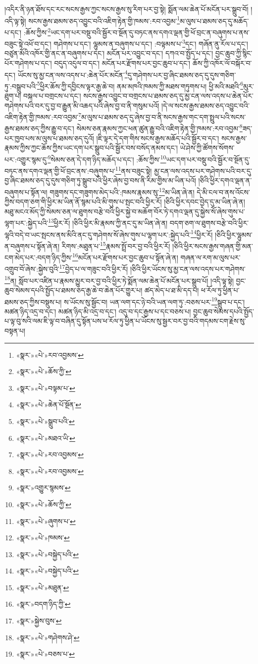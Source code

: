 །འདིར་ནི་ཉན་ཐོས་དང་རང་སངས་རྒྱས་ཀྱང་སངས་རྒྱས་སུ་རིག་པར་བྱ་སྟེ། སྨོན་ལམ་ཆེན་པོ་མངོན་པར་སྒྲུབ་བོ། །འདི་ལྟ་སྟེ། སངས་རྒྱས་ཐམས་ཅད་འབྱུང་བའི་འཇིག་རྟེན་གྱི་ཁམས་:རབ་འབྱམ་\footnote{«སྣར་»«པེ་»རབ་འབྱམས་}མ་ལུས་པ་ཐམས་ཅད་དུ་མཆོད་པ་དང་། :ཆོས་ཀྱིས་\footnote{«སྣར་»«པེ་»ཆོས་ཀྱི་}ཡང་དག་པར་བསྡུ་བའི་སྦྱོར་བ་སྔོན་དུ་བཏང་ནས་དགའ་ལྡན་གྱི་ཕོ་བྲང་ན་བཞུགས་པ་ནས་བཟུང་སྟེ་འཕོ་བ་དང་། གཤེགས་པ་དང་། ལྷུམས་ན་བཞུགས་པ་དང་། :བལྟམས་པ་\footnote{«སྣར་»«པེ་»བལྟམ་པ་}དང་། གཞོན་ནུ་རོལ་པ་དང་། བཙུན་མོའི་འཁོར་གྱི་ནང་ན་བཞུགས་པ་དང་། མངོན་པར་འབྱུང་བ་དང་། དཀའ་བ་སྤྱོད་པ་དང་། བྱང་ཆུབ་ཀྱི་སྙིང་པོར་གཤེགས་པ་དང་། བདུད་འདུལ་བ་དང་། མངོན་པར་རྫོགས་པར་བྱང་ཆུབ་པ་དང་། ཆོས་ཀྱི་འཁོར་ལོ་བསྐོར་བ་དང་། ཡོངས་སུ་མྱ་ངན་ལས་འདས་པ་:ཆེན་པོར་མངོན་\footnote{«སྣར་»«པེ་»ཆེན་པོ་སྔོན་}དུ་གཤེགས་པར་བྱ་ཞིང་ཐམས་ཅད་དུ་དུས་གཅིག་ཏུ་:བསྒྲུབ་པའི་\footnote{«སྣར་»«པེ་»སྒྲུབ་པའི་}ཕྱིར་ཆོས་ཀྱི་དབྱིངས་ལྟར་རྒྱ་ཆེ་བ། ནམ་མཁའི་ཁམས་ཀྱི་མཐས་གཏུགས་པ། ཕྱི་མའི་མཐའི་\footnote{«སྣར་»«པེ་»མཐའ་ཡི་}མུར་ཐུག་པ། བསྐལ་པ་བགྲངས་པ་དང་། སངས་རྒྱས་འབྱུང་བ་བགྲངས་པ་ཐམས་ཅད་དུ་མྱ་ངན་ལས་འདས་པ་ཆེན་པོར་གཤེགས་པའི་བར་དུ་བྱ་བ་རྒྱུན་མི་འཆད་པའི་ཞེས་བྱ་བ་ནི་གསུམ་པའོ། །དེ་ལ་སངས་རྒྱས་ཐམས་ཅད་འབྱུང་བའི་འཇིག་རྟེན་གྱི་ཁམས་:རབ་འབྱམ་\footnote{«སྣར་»«པེ་»རབ་འབྱམས་}མ་ལུས་པ་ཐམས་ཅད་དུ་ཞེས་བྱ་བ་ནི་སངས་རྒྱས་གང་དག་སྤྲུལ་པའི་སངས་རྒྱས་ཐམས་ཅད་ཀྱིས་རྒྱུ་བ་དང་། སེམས་ཅན་རྣམས་ཀྱང་ཕན་ཚུན་རྒྱུ་བའི་འཇིག་རྟེན་གྱི་ཁམས་:རབ་འབྱམ་\footnote{«སྣར་»«པེ་»རབ་འབྱམས་}ཟད་པར་ཁྱབ་པས་མ་ལུས་པ་ཐམས་ཅད་དུའོ། །ཇི་ལྟར་དེ་དག་གིས་སངས་རྒྱས་མཆོད་པའི་སྦྱོར་བ་དང་། སངས་རྒྱས་རྣམས་ཀྱིས་ཀྱང་ཆོས་ཀྱིས་ཡང་དག་པར་སྒྲུབ་པའི་སྦྱོར་བས་བསོད་ནམས་དང་། ཡེ་ཤེས་ཀྱི་ཚོགས་སོགས་པར་:འགྱུར་སྙམ་དུ་\footnote{«སྣར་»འགྱུར་སྙམས་}སེམས་ཅན་དེ་དག་ཉིད་མཆོད་པ་དང་། :ཆོས་ཀྱིས་\footnote{«སྣར་»«པེ་»ཆོས་ཀྱི་}ཡང་དག་པར་བསྡུ་བའི་སྦྱོར་བ་སྔོན་དུ་བཏང་ནས་དགའ་ལྡན་གྱི་ཕོ་བྲང་ནས་:བཞུགས་པ་\footnote{«སྣར་»«པེ་»ཞུགས་པ་}ནས་བཟུང་སྟེ། མྱ་ངན་ལས་འདས་པར་གཤེགས་པའི་བར་དུ་བྱ་ཞིང་ཐམས་ཅད་དུ་དུས་གཅིག་ཏུ་སྒྲུབ་པའི་ཕྱིར་ཞེས་བྱ་བས་ནི་རིམ་གྱིས་མ་ཡིན་པའོ། །ཅིའི་ཕྱིར་དགའ་ལྡན་ན་བཞུགས་པ་སྟོན་ལ། གཟུགས་དང་གཟུགས་མེད་པའི་:ཁམས་རྣམས་སུ་\footnote{«སྣར་»«པེ་»ཁམས་}མ་ཡིན་ཞེ་ན། དེ་མི་ངལ་བ་ནས་འོངས་ཀྱིས་བདག་ཅག་གི་ཕྱིར་མ་ཡིན་ནོ་སྙམ་པའི་མི་གུས་པ་སྤང་བའི་ཕྱིར་རོ། །ཅིའི་ཕྱིར་དབང་བྱེད་དུ་མ་ཡིན་ཞེ་ན། མཐུ་མངའ་མོད་ཀྱི་སེམས་ཅན་ལ་ཐུགས་བརྩེ་བའི་ཕྱིར་སྐྱེ་བ་མཆོག་བོར་ཏེ་དགའ་ལྡན་དུ་སྐྱེས་སོ་ཞེས་གུས་པ་ལྷག་པར་:སྐྱེད་པའི་\footnote{«སྣར་»«པེ་»བསྐྱེད་པའི་}ཕྱིར་རོ། །ཅིའི་ཕྱིར་མི་རྣམས་ཀྱི་ནང་དུ་མ་ཡིན་ཞེ་ན། བདག་ཅག་ལ་ཐུགས་བརྩེ་བའི་ཕྱིར་ལྷའི་བདེ་བ་ཡང་སྤངས་ནས་མིའི་ནང་དུ་གཤེགས་སོ་ཞེས་གུས་པ་ལྷག་པར་:སྐྱེད་པའི་\footnote{«སྣར་»«པེ་»བསྐྱེད་པའི་}ཕྱིར་རོ། །ཅིའི་ཕྱིར་ལྷུམས་ན་བཞུགས་པ་སྟོན་ཞེ་ན། རིགས་:མཐུན་པ་\footnote{«སྣར་»«པེ་»མཐུན་}རྣམས་སྤྲོ་བར་བྱ་བའི་ཕྱིར་རོ། །ཅིའི་ཕྱིར་སངས་རྒྱས་གཞན་གྱི་མན་ངག་མེད་པར་:བདག་ཉིད་ཀྱིས་\footnote{«སྣར་»བདག་ཉིད་ཀྱི་}མངོན་པར་རྫོགས་པར་བྱང་ཆུབ་པ་སྟོན་ཞེ་ན། གཞན་ལ་རག་མ་ལུས་པར་འགྲུབ་བོ་ཞེས་:སྐྱེས་བུའི་\footnote{«སྣར་»སྐྱེས་བུས་}བྱེད་པ་ལ་གཟུང་བའི་ཕྱིར་རོ། །ཅིའི་ཕྱིར་ཡོངས་སུ་མྱ་ངན་ལས་འདས་པར་གཤེགས་\footnote{«སྣར་»«པེ་»གཤེགས་ཤེ་}ན། སློབ་པར་འཛིན་པ་རྣམས་མྱུར་བར་བྱ་བའི་ཕྱིར་ཏེ་སྨོན་ལམ་ཆེན་པོ་མངོན་པར་སྒྲུབ་པོ། །འདི་ལྟ་སྟེ། བྱང་ཆུབ་སེམས་དཔའི་སྤྱོད་པ་ཐམས་ཅད་རྒྱ་ཆེ་བ་ཆེན་པོར་གྱུར་པ། ཚད་མེད་པ་ཐ་མི་དད་པ། ཕ་རོལ་ཏུ་ཕྱིན་པ་ཐམས་ཅད་ཀྱིས་བསྡུས་པ། ས་ཡོངས་སུ་སྦྱོང་བ། ཡན་ལག་དང་ཉེ་བའི་ཡན་ལག་ཏུ་:བཅས་པར་\footnote{«སྣར་»«པེ་»བཅས་པ་}སྒྲུབ་པ་དང་། མཚན་ཉིད་འདྲ་བ་དང་། མཚན་ཉིད་མི་འདྲ་བ་དང་། འདུ་བ་དང་རྒྱས་པ་དང་བཅས་པ། བྱང་ཆུབ་སེམས་དཔའི་སྤྱོད་པ་ལྟ་བུ་སའི་ལམ་ཇི་ལྟ་བ་བཞིན་དུ་སྟོན་པས་ཕ་རོལ་ཏུ་ཕྱིན་པ་ཡོངས་སུ་སྦྱར་བར་བྱ་བའི་གདམས་ངག་རྗེས་སུ་བསྟན་པ། 